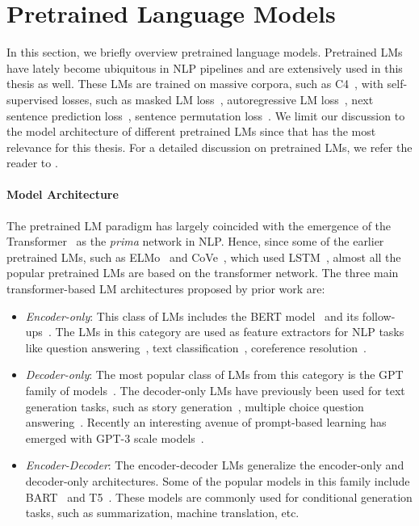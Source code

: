\documentclass[12pt]{thesis-umich}[thesis]
\begin{document}
 \section{Pretrained Language Models}
In this section, we briefly overview pretrained language models. Pretrained LMs have lately become ubiquitous in NLP pipelines and are extensively used in this thesis as well. 
These LMs are trained on massive corpora, such as C4~\cite{raffel-etal-2020-exploring}, with self-supervised losses, such as masked LM loss~\cite{devlin-etal-2019-bert, joshi-etal-2020-spanbert}, autoregressive LM loss~\cite{radford2019language}, next sentence prediction loss~\cite{devlin2019bert}, sentence permutation loss~\cite{lewis-etal-2020-bart}. 
We limit our discussion to the model architecture of different pretrained LMs since that has the most relevance for this thesis. For a detailed discussion on pretrained LMs, we refer the reader to \citet{qiu2020ptmsurvey}. 


\paragraph{Model Architecture} 

The pretrained LM paradigm has largely coincided with the emergence of the Transformer~\cite{vaswani2017attention} as the \emph{prima} network in NLP. Hence, since some of the earlier pretrained LMs, such as ELMo~\cite{peters-etal-2018-deep} and CoVe~\cite{mccann2017cove}, which used LSTM~\cite{hochreiter1997long}, almost all the popular pretrained LMs are based on the transformer network. The three main transformer-based LM architectures proposed by prior work are:
\begin{itemize}
    \item \emph{Encoder-only}: 
    This class of LMs includes the BERT model~\cite{devlin-etal-2019-bert} and its follow-ups~\citep[\emph{inter alia}]{joshi-etal-2019-bert, liu-etal-2019-roberta}. The LMs in this category are used as feature extractors for NLP tasks like question answering~\cite{karpukhin-etal-2020-dense}, text classification~\cite{sun2019fine}, coreference resolution~\cite{joshi-etal-2019-bert}. 
    \item \emph{Decoder-only}: The most popular class of LMs from this category is the GPT family of models~\cite{radford2018improving, radford2019language, brown2020language}. The decoder-only LMs have previously been used for text generation tasks, such as story generation~\cite{rashkin-etal-2020-plotmachines}, multiple choice question answering~\cite{radford2018improving}. Recently an interesting avenue of prompt-based learning has emerged with GPT-3 scale models~\cite{lester-etal-2021-power, li-liang-2021-prefix}.
    \item \emph{Encoder-Decoder}: The encoder-decoder LMs generalize the encoder-only and decoder-only architectures. Some of the popular models in this family include BART~\cite{lewis-etal-2020-bart} and T5~\cite{raffel-etal-2020-exploring}. These models are commonly used for conditional generation tasks, such as summarization, machine translation, etc.  
\end{itemize}
\end{document}
